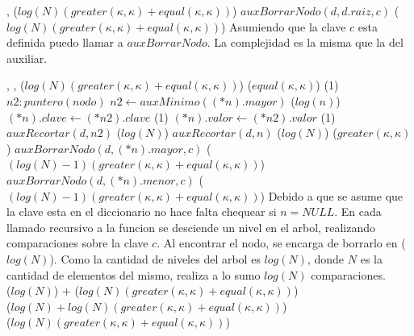 {   ,
    }
{}
{\bigo($log(N)(greater(\kappa, \kappa)+equal(\kappa, \kappa))$)}
{   \State $auxBorrarNodo(d, d.raiz, c)$                        \comment \bigo($log(N)(greater(\kappa, \kappa)+equal(\kappa, \kappa))$)
}
{   Asumiendo que la clave $c$ esta definida puedo llamar a $auxBorrarNodo$. 
    La complejidad es la misma que la del auxiliar. 
}


{   ,
    ,
    }
{}
{\bigo($log(N)(greater(\kappa, \kappa)+equal(\kappa, \kappa))$)}
{                                                \comment \bigo($equal(\kappa, \kappa)$)
              \comment \bigo(1)
            \var $n2 : puntero(nodo)$ 
            \State $n2 \gets auxMinimo((*n).mayor)$                     \comment \bigo($log(n)$)
            \State $(*n).clave \gets (*n2).clave$                       \comment \bigo(1)
            \State $(*n).valor \gets (*n2).valor$                       \comment \bigo(1)
            \State $auxRecortar(d, n2)$                                 \comment \bigo($log(N)$)
        \Else
            \State $auxRecortar(d, n)$                                  \comment \bigo($log(N)$)
        \EndIf
    \Else
                                                 \comment \bigo($greater(\kappa, \kappa)$)
            \State $auxBorrarNodo(d, (*n).mayor, c)$                    \comment \bigo($(log(N)-1)(greater(\kappa, \kappa)+equal(\kappa, \kappa))$)
        \Else
            \State $auxBorrarNodo(d, (*n).menor, c)$                    \comment \bigo($(log(N)-1)(greater(\kappa, \kappa)+equal(\kappa, \kappa))$)
        \EndIf
    \EndIf
}
{   Debido a que se asume que la clave esta en el diccionario no hace falta 
    chequear si $n = NULL$. En cada llamado recursivo a la funcion se desciende
    un nivel en el arbol, realizando comparaciones sobre la clave $c$. Al encontrar el
    nodo, se encarga de borrarlo en \bigo($log(N)$). Como la cantidad de niveles del 
    arbol es $log(N)$, donde $N$ es la cantidad de elementos del mismo, realiza a lo 
    sumo $log(N)$ comparaciones. \\   
    \hspace*{8em} \bigo($log(N)$) $+$ \bigo($log(N)(greater(\kappa, \kappa)+equal(\kappa, \kappa))$) \\
    \hspace*{8em} \bigo($log(N) + log(N)(greater(\kappa, \kappa)+equal(\kappa, \kappa))$) \\
    \hspace*{8em} \bigo($log(N)(greater(\kappa, \kappa)+equal(\kappa, \kappa))$)
}

